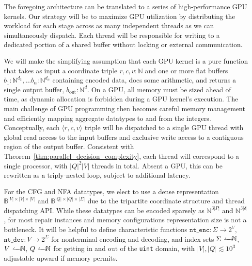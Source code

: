 \documentclass[popl.tex]{subfiles}
\begin{document}
The foregoing architecture can be translated to a series of high-performance GPU kernels. Our strategy will be to maximize GPU utilization by distributing the workload for each stage across as many independent threads as we can simultaneously dispatch. Each thread will be responsible for writing to a dedicated portion of a shared buffer without locking or external communication.

We will make the simplifying assumption that each GPU kernel is a pure function that takes as input a coordinate triple $r, c, v: \mathbb{N}$ and one or more flat buffers $b_1: \mathbb{N}^{d_1}, \ldots b_n: \mathbb{N}^{d_n}$ containing encoded data, does some arithmetic, and returns a single output buffer, $b_{\text{out}}: \mathbb{N}^{d}$. On a GPU, all memory must be sized ahead of time, as dynamic allocation is forbidden during a GPU kernel's execution. The main challenge of GPU programming then becomes careful memory management and efficiently mapping aggregate datatypes to and from the integers. Conceptually, each $\langle r, c, v\rangle$ triple will be dispatched to a single GPU thread with global read access to the input buffers and exclusive write access to a contiguous region of the output buffer. Consistent with Theorem~\ref{thm:parallel_decision_complexity}, each thread will correspond to a single processor, with $|Q|^2|V|$ threads in total. Absent a GPU, this can be rewritten as a triply-nested loop, subject to additional latency.

For the CFG and NFA datatypes, we elect to use a dense representation $\mathbb{B}^{|V|\times|V|\times|V|}$ and $\mathbb{B}^{|Q|\times|Q|\times |\Sigma|}$ due to the tripartite coordinate structure and thread dispatching API. While these datatypes can be encoded sparsely as $\mathbb{N}^{3|P|}$ and $\mathbb{N}^{3|\delta|}$, for most repair instances and memory configurations representation size is not a bottleneck. It will be helpful to define characteristic functions $\texttt{nt\_enc}: \Sigma \rightarrow 2^V$, $\texttt{nt\_dec}: V \rightarrow 2^\Sigma$ for nonterminal encoding and decoding, and index sets $\Sigma \leftharpoonrightarrow \mathbb{N}$, $V \leftharpoonrightarrow \mathbb{N}$, $Q \leftharpoonrightarrow \mathbb{N}$ for getting in and out of the \texttt{uint} domain, with $|V|, |Q| \lesssim 10^3$ adjustable upward if memory permits.
\end{document}
